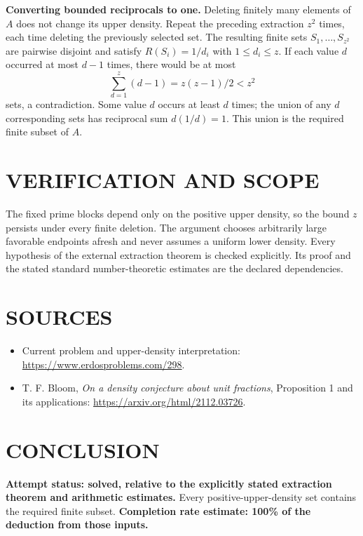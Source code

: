 \textbf{Converting bounded reciprocals to one.} Deleting finitely many elements of $A$ does not change its upper density. Repeat the preceding extraction $z^2$ times, each time deleting the previously selected set. The resulting finite sets $S_1,\ldots,S_{z^2}$ are pairwise disjoint and satisfy $R(S_i)=1/d_i$ with $1\leq d_i\leq z$. If each value $d$ occurred at most $d-1$ times, there would be at most
\[
\sum_{d=1}^z(d-1)=z(z-1)/2<z^2
\]
sets, a contradiction. Some value $d$ occurs at least $d$ times; the union of any $d$ corresponding sets has reciprocal sum $d(1/d)=1$. This union is the required finite subset of $A$.

\section{VERIFICATION AND SCOPE}
The fixed prime blocks depend only on the positive upper density, so the bound $z$ persists under every finite deletion. The argument chooses arbitrarily large favorable endpoints afresh and never assumes a uniform lower density. Every hypothesis of the external extraction theorem is checked explicitly. Its proof and the stated standard number-theoretic estimates are the declared dependencies.

\section{SOURCES}
\begin{itemize}
\item Current problem and upper-density interpretation: \url{https://www.erdosproblems.com/298}.
\item T. F. Bloom, \emph{On a density conjecture about unit fractions}, Proposition 1 and its applications: \url{https://arxiv.org/html/2112.03726}.
\end{itemize}
\section{CONCLUSION}
\textbf{Attempt status: solved, relative to the explicitly stated extraction theorem and arithmetic estimates.}
Every positive-upper-density set contains the required finite subset.
\textbf{Completion rate estimate: 100\% of the deduction from those inputs.}
